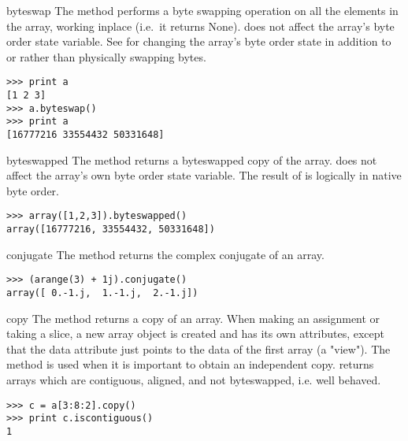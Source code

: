 \begin{methoddesc}[numarray]{byteswap}{}
   \label{arraymethod:byteswap}
   The  method performs a byte swapping operation on all the
   elements in the array, working inplace (i.e.\ it returns None).
    does not affect the array's byte order state variable.
   See  for changing the array's byte order state
   in addition to or rather than physically swapping bytes.
\begin{verbatim}
>>> print a
[1 2 3]
>>> a.byteswap()
>>> print a
[16777216 33554432 50331648]
\end{verbatim}
\end{methoddesc}


\begin{methoddesc}[numarray]{byteswapped}{}
  \label{arraymethod:byteswapped} 
  The  method returns a byteswapped copy of the array.
   does not affect the array's own byte order state
  variable.  The result of  is logically in native byte
  order.
\begin{verbatim}
>>> array([1,2,3]).byteswapped()
array([16777216, 33554432, 50331648])
\end{verbatim}
\end{methoddesc}


\begin{methoddesc}[numarray]{conjugate}{}
  \label{arraymethod:conjugate}
   The  method returns the complex conjugate of an array.
\begin{verbatim}
>>> (arange(3) + 1j).conjugate()
array([ 0.-1.j,  1.-1.j,  2.-1.j])
\end{verbatim}
\end{methoddesc}


\begin{methoddesc}[numarray]{copy}{}
  \label{arraymethod:copy}
   The  method returns a copy of an array. When making an
   assignment or taking a slice, a new array object is created and has its own
   attributes, except that the data attribute just points to the data of the
   first array (a "view").  The  method is used when it is
   important to obtain an independent copy.   returns arrays which
   are contiguous, aligned, and not byteswapped, i.e. well behaved.
\begin{verbatim}
>>> c = a[3:8:2].copy()
>>> print c.iscontiguous()
1
\end{verbatim}
\end{methoddesc}


